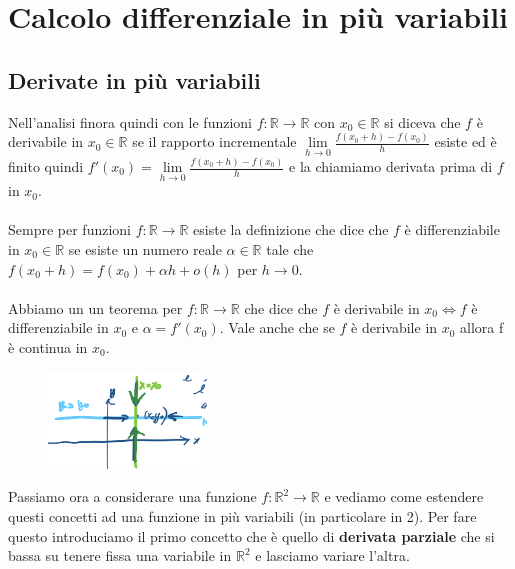 \newpage
\section{Calcolo differenziale in più variabili}
\subsection{Derivate in più variabili}
Nell'analisi finora quindi con le funzioni $f: \mathbb{R}\to \mathbb{R}$ con $x_0 \in \mathbb{R}$ si diceva che $f$ è derivabile in $x_0 \in \mathbb{R}$ se il rapporto incrementale $\lim\limits_{h\to 0}\frac{f(x_0 + h) - f(x_0)}{h}$ esiste ed è finito quindi $f'(x_0) = \lim\limits_{h\to 0}\frac{f(x_0 + h) - f(x_0)}{h}$ e la chiamiamo derivata prima di $f$ in $x_0$.\\\\
Sempre per funzioni $f: \mathbb{R}\to \mathbb{R}$ esiste la definizione che dice che $f$ è differenziabile in $x_0 \in \mathbb{R}$ se esiste un numero reale $\alpha \in \mathbb{R}$ tale che $f(x_0 + h) = f(x_0) + \alpha h + o(h)$ per $h \to 0$.\\\\
Abbiamo un un teorema per $f: \mathbb{R}\to \mathbb{R}$ che dice che $f$ è derivabile in $x_0 \Longleftrightarrow f$ è differenziabile in $x_0$ e $\alpha = f'(x_0)$. Vale anche che se $f$ è derivabile in $x_0$ allora f è continua in $x_0$.\\

\begin{figure}
    \vspace{-25pt}
    \centering
    \includegraphics[width=4.2cm]{images/derivata-parziale.png}
\end{figure}

Passiamo ora a considerare una funzione $f: \mathbb{R}^2 \to \mathbb{R}$ e vediamo come estendere questi concetti ad una funzione in più variabili (in particolare in 2). Per fare questo introduciamo il primo concetto che è quello di \textbf{derivata parziale} che si bassa su tenere fissa una variabile in $\mathbb{R}^2$ e lasciamo variare l'altra.


